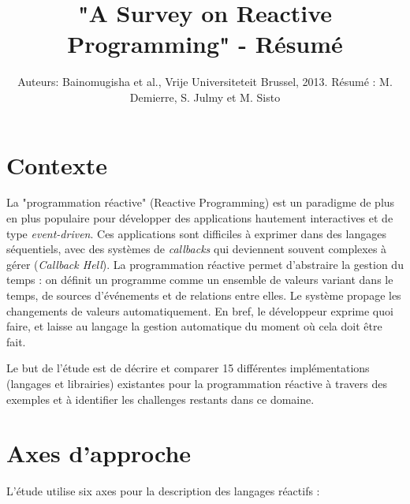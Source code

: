 \documentclass[10pt,final]{IEEEtran}
\begin{document}

\title{"A Survey on Reactive Programming" - Résumé}

\author{Auteurs: Bainomugisha et al., Vrije Universiteteit Brussel, 2013. Résumé : M. Demierre, S. Julmy et M. Sisto\vspace{-4.5ex}}

\maketitle

\section{Contexte}

La "programmation réactive" (Reactive Programming) est un paradigme de plus en plus populaire pour développer des applications hautement interactives et de type \textit{event-driven}. Ces applications sont difficiles à exprimer dans des langages séquentiels, avec des systèmes de \textit{callbacks} qui deviennent souvent complexes à gérer (\textit{Callback Hell}). La programmation réactive  permet d'abstraire la gestion du temps : on définit un programme comme un ensemble de valeurs variant dans le temps, de sources d'événements et de relations entre elles. Le système propage les changements de valeurs automatiquement. En bref, le développeur exprime quoi faire, et laisse au langage la gestion automatique du moment où cela doit être fait.

\vspace{1ex}
Le but de l'étude est de décrire et comparer 15 différentes implémentations (langages et librairies) existantes pour la programmation réactive à travers des exemples et à identifier les challenges restants dans ce domaine.

\section{Axes d'approche}
L'étude utilise six axes pour la description des langages réactifs :
\end{document}
